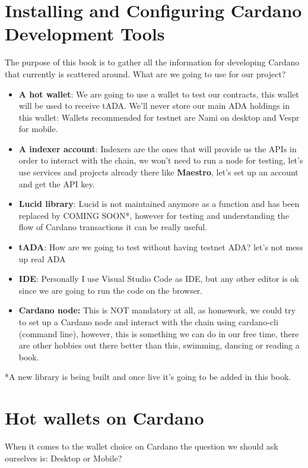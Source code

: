 \section{Installing and Configuring Cardano Development Tools}\label{sec:setup}
The purpose of this book is to gather all the information for developing Cardano that currently is scattered around.
What are we going to use for our project?


\begin{itemize}
    \item \textbf{A hot wallet}: We are going to use a wallet to test our contracts, this wallet will be used to receive tADA. We'll never store our main ADA holdings in this wallet: Wallets recommended for testnet are Nami on desktop and  Vespr for mobile.
    \item \textbf{A indexer account}: Indexers are the ones that will provide us the APIs in order to interact with the chain, we won't need to run a node for testing, let's use services and projects already there like \textbf{Maestro}, let's set up an account and get the API key.
    \item \textbf{Lucid library}: Lucid is not maintained anymore as a function and has been replaced by COMING SOON*, however for testing and understanding the flow of Cardano transactions it can be really useful.
    \item \textbf{tADA}: How are we going to test without having testnet ADA? let's not mess up real ADA
    \item  \textbf{IDE}: Personally I use Visual Studio Code as IDE, but any other editor is ok since we are going to run the code on the browser.
    \item \textbf{Cardano node:} This is NOT mandatory at all, as homework, we could try to set up a Cardano node and interact with the chain using cardano-cli (command line), however, this is something we can do in our free time, there are other hobbies out there better than this, swimming, dancing or reading a book.
\end{itemize}

*A new library is being built and once live it's going to be added in this book.

\section{Hot wallets on Cardano}
When it comes to the wallet choice on Cardano the question we should ask ourselves is: Desktop or Mobile?

